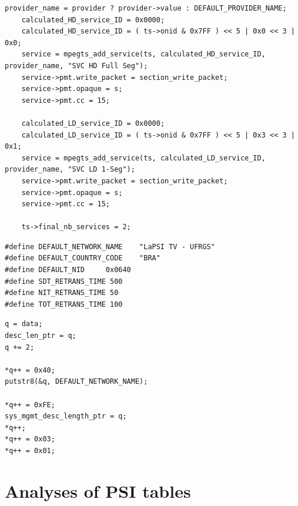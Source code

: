 \documentclass[
	12pt,				%
	openright,			%
	twoside,			%
	a4paper,			%
	brazil,
	french,				%
	english
	]{abntex2}
\begin{document}
\begin{apendicesenv}
\begin{lstlisting}[caption={}, label=[]
    provider_name = provider ? provider->value : DEFAULT_PROVIDER_NAME;
	calculated_HD_service_ID = 0x0000;
	calculated_HD_service_ID = ( ts->onid & 0x7FF ) << 5 | 0x0 << 3 | 0x0;
	service = mpegts_add_service(ts, calculated_HD_service_ID, provider_name, "SVC HD Full Seg");
	service->pmt.write_packet = section_write_packet;
	service->pmt.opaque = s;
	service->pmt.cc = 15;

	calculated_LD_service_ID = 0x0000;
	calculated_LD_service_ID = ( ts->onid & 0x7FF ) << 5 | 0x3 << 3 | 0x1;
	service = mpegts_add_service(ts, calculated_LD_service_ID, provider_name, "SVC LD 1-Seg");
	service->pmt.write_packet = section_write_packet;
	service->pmt.opaque = s;
	service->pmt.cc = 15;
	
	ts->final_nb_services = 2;
\end{lstlisting}

\begin{lstlisting}[caption={Created macros.}, label={lst_macros}]
#define DEFAULT_NETWORK_NAME    "LaPSI TV - UFRGS"
#define DEFAULT_COUNTRY_CODE    "BRA"
#define DEFAULT_NID		0x0640
#define SDT_RETRANS_TIME 500
#define NIT_RETRANS_TIME 50
#define TOT_RETRANS_TIME 100
\end{lstlisting}

\begin{lstlisting}[caption={.}, label={lst_pointer_assignment}]
q = data;
desc_len_ptr = q;
q += 2;

*q++ = 0x40;
putstr8(&q, DEFAULT_NETWORK_NAME);

*q++ = 0xFE;
sys_mgmt_desc_length_ptr = q;
*q++;
*q++ = 0x03;
*q++ = 0x01;
\end{lstlisting}

\chapter{Analyses of PSI tables}
\label{pat_pmt_analysis}


\end{apendicesenv}
\end{document}
